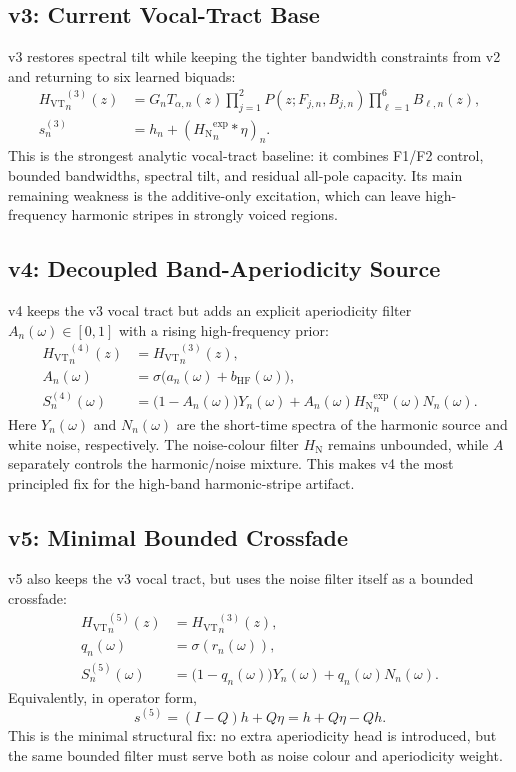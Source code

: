 \documentclass[11pt]{article}
\newcommand{\src}{s}
\newcommand{\harm}{h}
\newcommand{\noise}{\eta}
\newcommand{\vt}{H_{\mathrm{VT}}}
\newcommand{\nfilt}{H_{\mathrm{N}}}
\newcommand{\ap}{A}
\newcommand{\biquad}{B}
\newcommand{\pole}{P}
\begin{document}
\subsection{v3: Current Vocal-Tract Base}

v3 restores spectral tilt while keeping the tighter bandwidth constraints from
v2 and returning to six learned biquads:
\begin{align}
  {\vt}^{(3)}_n(z)
  &=
  G_n T_{\alpha,n}(z)
  \prod_{j=1}^{2}\pole(z;F_{j,n},B_{j,n})
  \prod_{\ell=1}^{6}\biquad_{\ell,n}(z),\\
  \src^{(3)}_n
  &=
  \harm_n + ({\nfilt}^{\exp}_n * \noise)_n.
\end{align}
This is the strongest analytic vocal-tract baseline: it combines F1/F2 control,
bounded bandwidths, spectral tilt, and residual all-pole capacity. Its main
remaining weakness is the additive-only excitation, which can leave
high-frequency harmonic stripes in strongly voiced regions.

\subsection{v4: Decoupled Band-Aperiodicity Source}

v4 keeps the v3 vocal tract but adds an explicit aperiodicity filter
$\ap_n(\omega)\in[0,1]$ with a rising high-frequency prior:
\begin{align}
  {\vt}^{(4)}_n(z) &= {\vt}^{(3)}_n(z),\\
  \ap_n(\omega)
  &=
  \sigma\bigl(a_n(\omega)+b_{\mathrm{HF}}(\omega)\bigr),\\
  S^{(4)}_n(\omega)
  &=
  \bigl(1-\ap_n(\omega)\bigr)Y_n(\omega)
  +
  \ap_n(\omega){\nfilt}^{\exp}_n(\omega)N_n(\omega).
\end{align}
Here $Y_n(\omega)$ and $N_n(\omega)$ are the short-time spectra of the harmonic
source and white noise, respectively. The noise-colour filter $\nfilt$ remains
unbounded, while $\ap$ separately controls the harmonic/noise mixture. This
makes v4 the most principled fix for the high-band harmonic-stripe artifact.

\subsection{v5: Minimal Bounded Crossfade}

v5 also keeps the v3 vocal tract, but uses the noise filter itself as a bounded
crossfade:
\begin{align}
  {\vt}^{(5)}_n(z) &= {\vt}^{(3)}_n(z),\\
  q_n(\omega) &= \sigma(r_n(\omega)),\\
  S^{(5)}_n(\omega)
  &=
  \bigl(1-q_n(\omega)\bigr)Y_n(\omega)
  +
  q_n(\omega)N_n(\omega).
\end{align}
Equivalently, in operator form,
\begin{equation}
  \src^{(5)}
  =
  (I-Q)\harm + Q\noise
  =
  \harm + Q\noise - Q\harm.
\end{equation}
This is the minimal structural fix: no extra aperiodicity head is introduced,
but the same bounded filter must serve both as noise colour and aperiodicity
weight.
\end{document}
